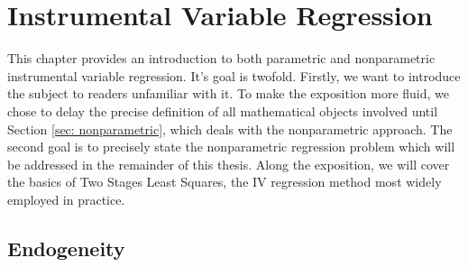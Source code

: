 \chapter{Instrumental Variable Regression}

This chapter provides an introduction to both parametric and nonparametric instrumental variable regression.
It's goal is twofold.
Firstly, we want to introduce the subject to readers unfamiliar with it.
To make the exposition more fluid, we chose to delay the precise definition of all mathematical objects involved until Section \ref{sec: nonparametric}, which deals with the nonparametric approach.
The second goal is to precisely state the nonparametric regression problem which will be addressed in the remainder of this thesis.
Along the exposition, we will cover the basics of Two Stages Least Squares, the IV regression method most widely employed in practice.%

\section{Endogeneity}

